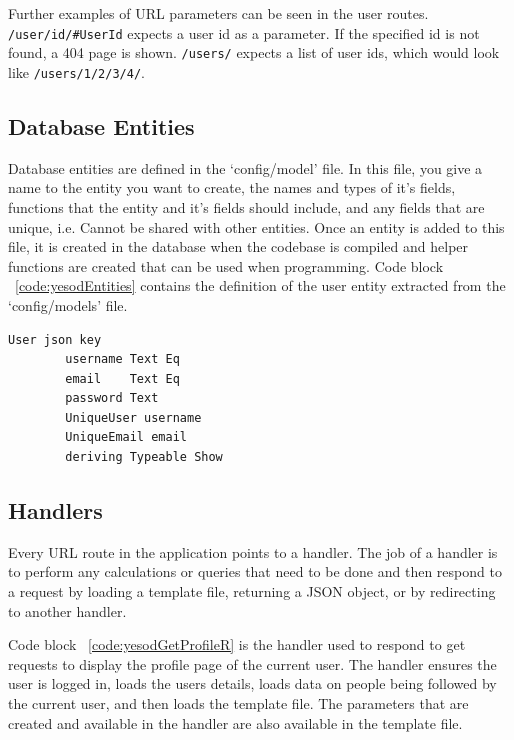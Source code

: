 Further examples of URL parameters can be seen in the user routes. 
\texttt{/user/id/\#UserId} expects a user id as a parameter. If the specified
id is not found, a 404 page is shown. \texttt{/users/\*[UserId]} expects a list
of user ids, which would look like \texttt{/users/1/2/3/4/}.

\subsection{Database Entities}

Database entities are defined in the `config/model' file. In this file, you
give a name to the entity you want to create, the names and types of it's
fields, functions that the entity and it's fields should include, and
any fields that are unique, i.e. Cannot be shared with other entities.
Once an entity is added to this file, it is created in the database
when the codebase is compiled and helper functions are created that
can be used when programming. Code block ~\ref{code:yesodEntities} contains
the definition of the user entity extracted from the `config/models' file.

\begin{lstlisting}[caption={Yesod Database Entities},label={code:yesodEntities}]
    User json key
        username Text Eq
        email    Text Eq
        password Text
        UniqueUser username
        UniqueEmail email
        deriving Typeable Show
\end{lstlisting}

\subsection{Handlers}

Every URL route in the application points to a handler. The job of a handler
is to perform any calculations or queries that need to be done and then respond
to a request by loading a template file, returning a JSON object, or by redirecting
to another handler.

Code block ~\ref{code:yesodGetProfileR} is the handler used to respond to get requests
to display the profile page of the current user. The handler ensures the user is logged in,
loads the users details, loads data on people being followed by the current user,
and then loads the template file. The parameters that are created and available
in the handler are also available in the template file.


